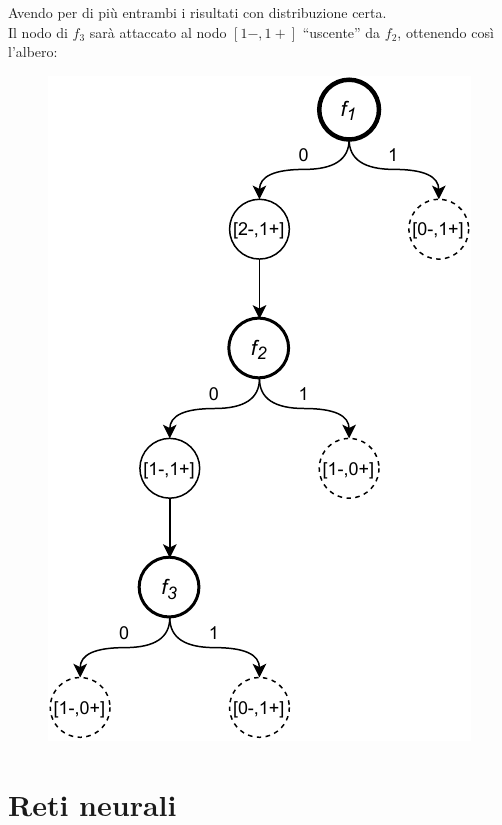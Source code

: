 \documentclass[a4paper,12pt, oneside]{book}
\begin{document}
\begin{esercizio}
\begin{figure}[H]
  \end{figure}
  Avendo per di più entrambi i risultati con distribuzione certa.\\
  Il nodo di $f_3$ sarà attaccato al nodo $[1-,1+]$ ``uscente'' da $f_2$,
  ottenendo così l'albero:
  \begin{figure}[H]
    \centering
    \includegraphics[scale = 1]{img/id8.pdf}
  \end{figure}
\end{esercizio}
\chapter{Reti neurali}
\end{document}
